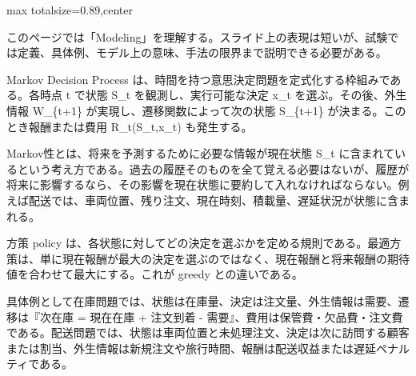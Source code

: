 \begin{minipage}[t]{0.58\textwidth}
\begin{adjustbox}{max totalsize={\textwidth}{0.89\textheight},center}
\begin{minipage}{\textwidth}\scriptsize
{}このページでは「Modeling」を理解する。スライド上の表現は短いが、試験では定義、具体例、モデル上の意味、手法の限界まで説明できる必要がある。\par
Markov Decision Process は、時間を持つ意思決定問題を定式化する枠組みである。各時点 t で状態 S\_t を観測し、実行可能な決定 x\_t を選ぶ。その後、外生情報 W\_\{t+1\} が実現し、遷移関数によって次の状態 S\_\{t+1\} が決まる。このとき報酬または費用 R\_t(S\_t,x\_t) も発生する。\par
Markov性とは、将来を予測するために必要な情報が現在状態 S\_t に含まれているという考え方である。過去の履歴そのものを全て覚える必要はないが、履歴が将来に影響するなら、その影響を現在状態に要約して入れなければならない。例えば配送では、車両位置、残り注文、現在時刻、積載量、遅延状況が状態に含まれる。\par
方策 policy は、各状態に対してどの決定を選ぶかを定める規則である。最適方策は、単に現在報酬が最大の決定を選ぶのではなく、現在報酬と将来報酬の期待値を合わせて最大にする。これが greedy との違いである。\par
具体例として在庫問題では、状態は在庫量、決定は注文量、外生情報は需要、遷移は『次在庫 = 現在在庫 + 注文到着 - 需要』、費用は保管費・欠品費・注文費である。配送問題では、状態は車両位置と未処理注文、決定は次に訪問する顧客または割当、外生情報は新規注文や旅行時間、報酬は配送収益または遅延ペナルティである。\par

\end{minipage}
\end{adjustbox}
\end{minipage}
